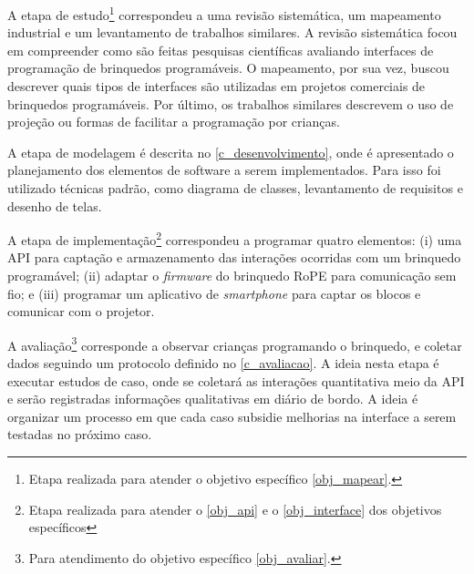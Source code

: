 A etapa de estudo\footnote{Etapa realizada para atender o objetivo específico \autoref{obj_mapear}. } correspondeu a uma revisão sistemática, um mapeamento industrial e um levantamento de trabalhos similares. A revisão sistemática focou em compreender como são feitas pesquisas científicas avaliando interfaces de programação de brinquedos programáveis. O mapeamento, por sua vez, buscou descrever quais tipos de interfaces são utilizadas em projetos comerciais de brinquedos programáveis. Por último, os trabalhos similares descrevem o uso de projeção ou formas de facilitar a programação por crianças.

A etapa de modelagem é descrita no \autoref{c_desenvolvimento}, onde é apresentado o planejamento dos elementos de software a serem implementados. Para isso foi utilizado técnicas padrão, como diagrama de classes, levantamento de requisitos e desenho de telas.

A etapa de implementação\footnote{Etapa realizada para atender o \autoref{obj_api} e o \autoref{obj_interface} dos objetivos específicos} correspondeu a programar quatro elementos: (i) uma \ac{API} para captação e armazenamento das interações ocorridas com um brinquedo programável; (ii) adaptar o \textit{firmware} do brinquedo RoPE para comunicação sem fio; e (iii) programar um aplicativo de \textit{smartphone} para captar os blocos e comunicar com o projetor.

A avaliação\footnote{ Para atendimento do objetivo específico \autoref{obj_avaliar}.} corresponde a observar crianças programando o brinquedo, e coletar dados seguindo um protocolo definido no \autoref{c_avaliacao}. A ideia nesta etapa é executar estudos de caso, onde se coletará as interações quantitativa meio da \ac{API} e serão registradas informações qualitativas em diário de bordo. A ideia é organizar um processo em que cada caso subsidie melhorias na interface a serem testadas no próximo caso.

